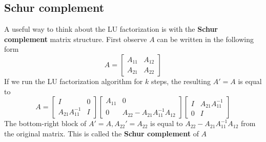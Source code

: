 \documentclass{article}
\begin{document}
\subsection{Schur complement}
A useful way to think about the LU factorization is with the \textbf{Schur complement} matrix structure. First observe $A$ can be written in the following form
\begin{equation*}
    A = \begin{bmatrix} A_{11} & A_{12}\\ A_{21} & A_{22}\end{bmatrix}
\end{equation*}
If we run the LU factorization algorithm for $k$ steps, the resulting $A' = A$ is equal to 
\begin{equation*}
    A = \begin{bmatrix} I & 0\\ A_{21}A_{11}^{-1} & I\end{bmatrix}
    \begin{bmatrix} A_{11} & 0\\ 0 & A_{22} - A_{21}A_{11}^{-1}A_{12}\end{bmatrix}
    \begin{bmatrix} I & A_{21}A_{11}^{-1}\\ 0 & I\end{bmatrix}
\end{equation*}
The bottom-right block of $A'=A, A_{22}' = A_{22}$ is equal to $A_{22} - A_{21}A_{11}^{-1}A_{12}$ from the original matrix. This is called the \textbf{Schur complement} of $A$
\end{document}
